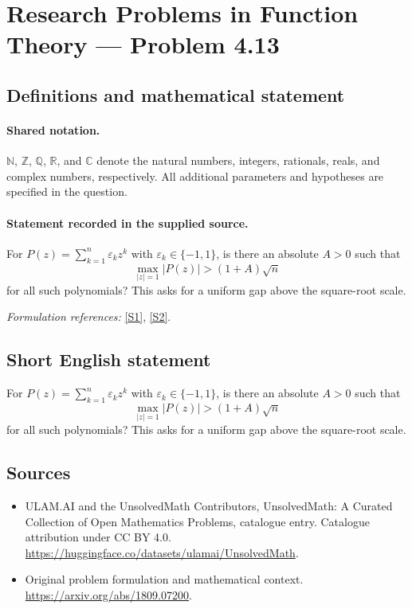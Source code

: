 \documentclass[11pt]{article}
\newcommand{\sref}[2]{\hyperlink{source:#1:#2}{[S#2]}}
\begin{document}
\section{Research Problems in Function Theory — Problem 4.13}\label{statement}

\subsection{Definitions and mathematical statement}

\paragraph{Shared notation.}$\mathbb N$, $\mathbb Z$, $\mathbb Q$, $\mathbb R$, and $\mathbb C$ denote the natural numbers, integers, rationals, reals, and complex numbers, respectively. All additional parameters and hypotheses are specified in the question.


\paragraph{Statement recorded in the supplied source.}
For $P(z)=\sum_{k=1}^n\varepsilon_kz^k$ with $\varepsilon_k\in\{-1,1\}$, is there an absolute $A>0$ such that
\[\max_{|z|=1}|P(z)|>(1+A)\sqrt n\]
for all such polynomials? This asks for a uniform gap above the square-root scale.
\par\smallskip\textit{Formulation references:} \sref{statement}{1}, \sref{statement}{2}.
\subsection{Short English statement}
For $P(z)=\sum_{k=1}^n\varepsilon_kz^k$ with $\varepsilon_k\in\{-1,1\}$, is there an absolute $A>0$ such that
\[\max_{|z|=1}|P(z)|>(1+A)\sqrt n\]
for all such polynomials? This asks for a uniform gap above the square-root scale.
\subsection{Sources}
\begin{itemize}
\item[\hypertarget{source:statement:1}{S1}] ULAM.AI and the UnsolvedMath Contributors, UnsolvedMath: A Curated Collection of Open Mathematics Problems, catalogue entry. Catalogue attribution under CC BY 4.0.
\url{https://huggingface.co/datasets/ulamai/UnsolvedMath}.
\item[\hypertarget{source:statement:2}{S2}] Original problem formulation and mathematical context.
\url{https://arxiv.org/abs/1809.07200}.
\end{itemize}
\label{end:statement}
\end{document}
